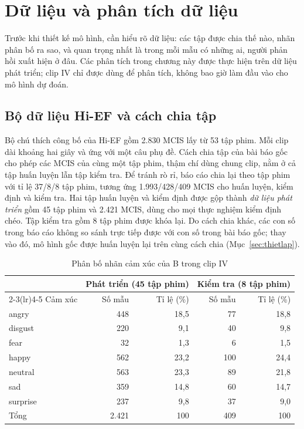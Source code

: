 \clearpage
{}
\chapter[DỮ LIỆU VÀ PHÂN TÍCH DỮ LIỆU]{Dữ liệu và phân tích dữ liệu}

Trước khi thiết kế mô hình, cần hiểu rõ dữ liệu: các tập được chia thế nào, nhãn phân bố ra sao, và quan trọng nhất là trong mỗi mẫu có những ai, người phản hồi xuất hiện ở đâu. Các phân tích trong chương này được thực hiện trên dữ liệu phát triển; clip IV chỉ được dùng để phân tích, không bao giờ làm đầu vào cho mô hình dự đoán.

\section{Bộ dữ liệu Hi-EF và cách chia tập}

Bộ chú thích công bố của Hi-EF gồm 2.830 MCIS lấy từ 53 tập phim. Mỗi clip dài khoảng hai giây và ứng với một câu phụ đề. Cách chia tập của bài báo gốc cho phép các MCIS của cùng một tập phim, thậm chí dùng chung clip, nằm ở cả tập huấn luyện lẫn tập kiểm tra. Để tránh rò rỉ, báo cáo chia lại theo tập phim với tỉ lệ 37/8/8 tập phim, tương ứng 1.993/428/409 MCIS cho huấn luyện, kiểm định và kiểm tra. Hai tập huấn luyện và kiểm định được gộp thành \emph{dữ liệu phát triển} gồm 45 tập phim và 2.421 MCIS, dùng cho mọi thực nghiệm kiểm định chéo. Tập kiểm tra gồm 8 tập phim được khóa lại. Do cách chia khác, các con số trong báo cáo không so sánh trực tiếp được với con số trong bài báo gốc; thay vào đó, mô hình gốc được huấn luyện lại trên cùng cách chia (Mục~\ref{sec:thietlap}).

\begin{table}[!htb]
\centering
\caption{Phân bố nhãn cảm xúc của B trong clip IV}
\label{tab:phanbo}
\begin{tabular}{lrrrr}
\toprule
 & \multicolumn{2}{c}{Phát triển (45 tập phim)} & \multicolumn{2}{c}{Kiểm tra (8 tập phim)} \\
\cmidrule(lr){2-3}\cmidrule(lr){4-5}
Cảm xúc & Số mẫu & Tỉ lệ (\%) & Số mẫu & Tỉ lệ (\%) \\
\midrule
angry & 448 & 18,5 & 77 & 18,8 \\
disgust & 220 & 9,1 & 40 & 9,8 \\
fear & 32 & 1,3 & 6 & 1,5 \\
happy & 562 & 23,2 & 100 & 24,4 \\
neutral & 563 & 23,3 & 89 & 21,8 \\
sad & 359 & 14,8 & 60 & 14,7 \\
surprise & 237 & 9,8 & 37 & 9,0 \\
\midrule
Tổng & 2.421 & 100 & 409 & 100 \\
\bottomrule
\end{tabular}
\end{table}

